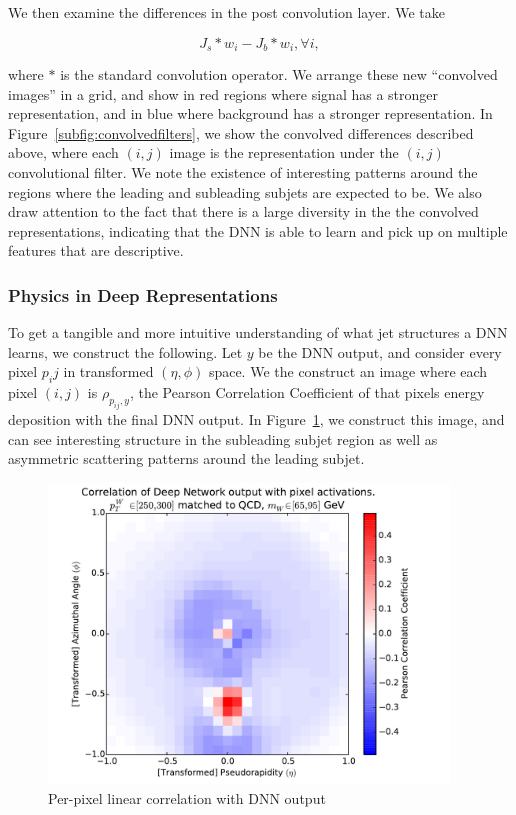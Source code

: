 We then examine the differences in the post convolution layer. We take 

\begin{equation}
  J_s \ast w_i - J_b \ast w_i, \forall i,
\end{equation}

where $\ast$ is the standard convolution operator. We arrange these new ``convolved images'' in a grid, and show in red regions where signal has a stronger representation, and in blue where background has a stronger representation. In Figure~\ref{subfig:convolvedfilters}, we show the convolved differences described above, where each $(i, j)$ image is the representation under the $(i, j)$ convolutional filter. We note the existence of interesting patterns around the regions where the leading and subleading subjets are expected to be. We also draw attention to the fact that there is a large diversity in the the convolved representations, indicating that the DNN is able to learn and pick up on multiple features that are descriptive.



\subsubsection{Physics in Deep Representations} %
\label{ssub:physics_in_deep_representations}

To get a tangible and more intuitive understanding of what jet structures a DNN learns, we construct the following. Let $y$ be the DNN output, and consider every pixel $p_ij$ in transformed $(\eta, \phi)$ space. We the construct an image where each pixel $(i, j)$ is $\rho_{p_{ij}, y}$, the Pearson Correlation Coefficient of that pixels energy deposition with the final DNN output. In Figure~\ref{fig:corr}, we construct this image, and can see interesting structure in the subleading subjet region as well as asymmetric scattering patterns around the leading subjet.




\begin{figure}[!htbp]
  \centering
  \includegraphics[width=0.95\textwidth]{figures/pixel-activations-corr.pdf}
  \caption{Per-pixel linear correlation with DNN output}
  \label{fig:corr}
\end{figure}


